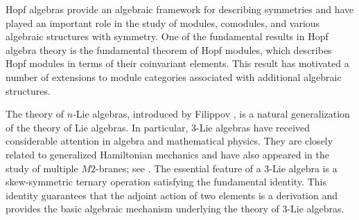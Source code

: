 \documentclass[11pt]{article}
\begin{document}
%
%
%

Hopf algebras provide an algebraic framework for describing symmetries and have played an important role in the study of modules, comodules, and various algebraic structures with symmetry. One of the fundamental results in Hopf algebra theory is the fundamental theorem of Hopf modules, which describes Hopf modules in terms of their coinvariant elements. This result has motivated a number of extensions to module categories associated with additional algebraic structures.

The theory of $n$-Lie algebras, introduced by Filippov \cite{Filippov}, is a natural generalization of the theory of Lie algebras. In particular, 3-Lie algebras have received considerable attention in algebra and mathematical physics. They are closely related to generalized Hamiltonian mechanics and have also appeared in the study of multiple $M2$-branes; see \cite{Na,Tak,Az,BL1,BL2,HHM,FT}. The essential feature of a 3-Lie algebra is a skew-symmetric ternary operation satisfying the fundamental identity. This identity guarantees that the adjoint action of two elements is a derivation and provides the basic algebraic mechanism underlying the theory of 3-Lie algebras.
\end{document}
